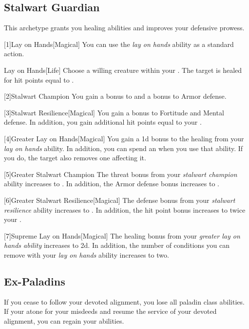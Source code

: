     \subsection{Stalwart Guardian}
        This archetype grants you healing abilities and improves your defensive prowess.

        [1]{Lay on Hands}[Magical] You can use the \textit{lay on hands} ability as a standard action.
        \begin{freeability}{Lay on Hands}[Life]
            Choose a willing creature within your .
            The target is healed for hit points equal to .
        \end{freeability}

        [2]{Stalwart Champion}
        You gain a  bonus to  and a  bonus to Armor defense.

        [3]{Stalwart Resilience}[Magical]
        You gain a  bonus to Fortitude and Mental defense.
        In addition, you gain additional hit points equal to your .

        [4]{Greater Lay on Hands}[Magical]
        You gain a \plus1d bonus to the healing from your \textit{lay on hands} ability.
        In addition, you can spend an  when you use that ability.
        If you do, the target also removes one  affecting it.

        [5]{Greater Stalwart Champion} The threat bonus from your \textit{stalwart champion} ability increases to .
        In addition, the Armor defense bonus increases to .

        [6]{Greater Stalwart Resilience}[Magical] The defense bonus from your \textit{stalwart resilience} ability increases to .
        In addition, the hit point bonus increases to twice your .

        [7]{Supreme Lay on Hands}[Magical]
        The healing bonus from your \textit{greater lay on hands ability} increases to \plus2d.
        In addition, the number of conditions you can remove with your \textit{lay on hands} ability increases to two.

    \subsection{Ex-Paladins}
        If you cease to follow your devoted alignment, you lose all  paladin class abilities.
        If your atone for your misdeeds and resume the service of your devoted alignment, you can regain your abilities.

